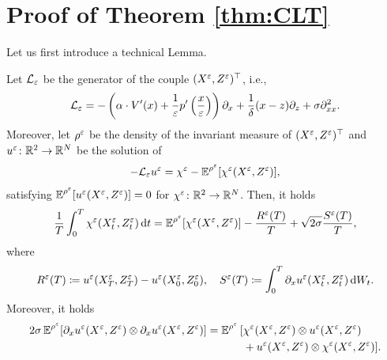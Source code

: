 \documentclass[10pt]{article}
\begin{document}
\section{Proof of Theorem \ref{thm:CLT}}\label{ap:CLT}

Let us first introduce a technical Lemma.
\begin{lemma}\label{lem:CLT} Let $\mathcal L_\varepsilon$ be the generator of the couple $(X^\varepsilon, Z^\varepsilon)^\top$, i.e.,
	\begin{equation}
		\mathcal L_\varepsilon = -\left(\alpha \cdot V'(x) + \frac1{\varepsilon} p'\left(\frac{x}{\varepsilon}\right)\right)\partial_x + \frac1\delta (x - z) \partial_z  + \sigma \partial^2_{xx}.
	\end{equation} 
	Moreover, let $\rho^\varepsilon$ be the density of the invariant measure of $(X^\varepsilon, Z^\varepsilon)^\top$ and $u^\varepsilon\colon \mathbb{R}^2 \to \mathbb{R}^N$ be the solution of 
	\begin{equation}\label{eq:CLT_Poisson}
		-\mathcal L_\varepsilon u^\varepsilon = \chi^\varepsilon -  \operatorname{\mathbb{E}}^{\rho^\varepsilon}[\chi^\varepsilon(X^\varepsilon, Z^\varepsilon)],
	\end{equation}
	satisfying $\operatorname{\mathbb{E}}^{\rho^\varepsilon}[u^\varepsilon(X^\varepsilon, Z^\varepsilon)] = 0$ for $\chi^\varepsilon \colon \mathbb{R}^2 \to \mathbb{R}^N$. Then, it holds
	\begin{equation}\label{eq:CLT_PoissonIto}
		\frac{1}{T} \int_0^T  \chi^\varepsilon(X_t^\varepsilon, Z_t^\varepsilon) \,\mathrm{d} t = \operatorname{\mathbb{E}}^{\rho^\varepsilon}[\chi^\varepsilon(X^\varepsilon, Z^\varepsilon)] - \frac{R^\varepsilon(T)}{T} + \sqrt{2\sigma}\frac{S^\varepsilon(T)}{T},
	\end{equation}
	where
	\begin{equation}\label{eq:CLT_PoissonRemainders}
		R^\varepsilon(T) \coloneqq u^\varepsilon(X^\varepsilon_T, Z^\varepsilon_T) - u^\varepsilon(X^\varepsilon_0, Z^\varepsilon_0), \quad S^\varepsilon(T) \coloneqq \int_0^T \partial_x u^\varepsilon(X_t^\varepsilon, Z_t^\varepsilon) \,\mathrm{d} W_t.
	\end{equation}
	Moreover, it holds
	\begin{equation}\label{eq:CLT_Equiv}
		2\sigma \operatorname{\mathbb{E}}^{\rho^\varepsilon}[\partial_x u^\varepsilon(X^\varepsilon, Z^\varepsilon) \otimes \partial_x u^\varepsilon(X^\varepsilon, Z^\varepsilon)] = \operatorname{\mathbb{E}}^{\rho^\varepsilon}
		\begin{aligned}[t]
		[&\chi^\varepsilon(X^\varepsilon, Z^\varepsilon) \otimes u^\varepsilon(X^\varepsilon, Z^\varepsilon) \\
		&+ u^\varepsilon(X^\varepsilon, Z^\varepsilon) \otimes \chi^\varepsilon(X^\varepsilon, Z^\varepsilon)].
		\end{aligned}
	\end{equation}	
\end{lemma}
\end{document}
